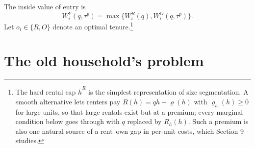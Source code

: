\documentclass[11pt]{article}
\newcommand{\1}{\mathbf 1}
\begin{document}
The inside value of entry is
\begin{equation}
W_i^Y(q,\tau^p)
=
\max\{W_i^R(q),W_i^O(q,\tau^p)\}.
\label{eq:compact_tenure_value}
\end{equation}
Let $o_i\in\{R,O\}$ denote an optimal tenure.\footnote{The hard rental cap $\bar h^R$ is the simplest representation of size segmentation. A smooth alternative lets renters pay $R(h)=q h+\varrho(h)$ with $\varrho_h(h)\ge0$ for large units, so that large rentals exist but at a premium; every marginal condition below goes through with $q$ replaced by $R_h(h)$. Such a premium is also one natural source of a rent--own gap in per-unit costs, which Section 9 studies.}

\section{The old household's problem}
\end{document}
